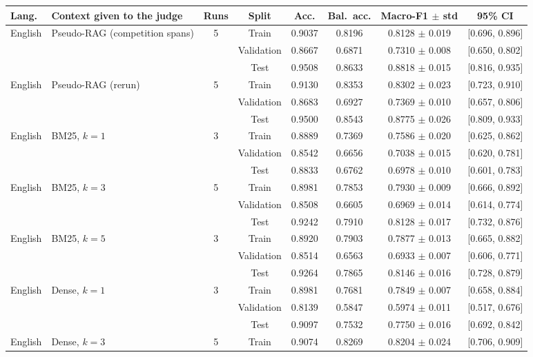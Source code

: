 \begin{tabular}{llcccccc}
\hline
\textbf{Lang.} & \textbf{Context given to the judge} & \textbf{Runs} & \textbf{Split} & \textbf{Acc.} & \textbf{Bal.\ acc.} & \textbf{Macro-F1 $\pm$ std} & \textbf{95\% CI} \\
\hline
English & Pseudo-RAG (competition spans) & 5 & Train & 0.9037 & 0.8196 & 0.8128 $\pm$ 0.019 & [0.696, 0.896] \\
 & &  & Validation & 0.8667 & 0.6871 & 0.7310 $\pm$ 0.008 & [0.650, 0.802] \\
 & &  & Test & 0.9508 & 0.8633 & 0.8818 $\pm$ 0.015 & [0.816, 0.935] \\
English & Pseudo-RAG (rerun) & 5 & Train & 0.9130 & 0.8353 & 0.8302 $\pm$ 0.023 & [0.723, 0.910] \\
 & &  & Validation & 0.8683 & 0.6927 & 0.7369 $\pm$ 0.010 & [0.657, 0.806] \\
 & &  & Test & 0.9500 & 0.8543 & 0.8775 $\pm$ 0.026 & [0.809, 0.933] \\
English & BM25, $k=1$ & 3 & Train & 0.8889 & 0.7369 & 0.7586 $\pm$ 0.020 & [0.625, 0.862] \\
 & &  & Validation & 0.8542 & 0.6656 & 0.7038 $\pm$ 0.015 & [0.620, 0.781] \\
 & &  & Test & 0.8833 & 0.6762 & 0.6978 $\pm$ 0.010 & [0.601, 0.783] \\
English & BM25, $k=3$ & 5 & Train & 0.8981 & 0.7853 & 0.7930 $\pm$ 0.009 & [0.666, 0.892] \\
 & &  & Validation & 0.8508 & 0.6605 & 0.6969 $\pm$ 0.014 & [0.614, 0.774] \\
 & &  & Test & 0.9242 & 0.7910 & 0.8128 $\pm$ 0.017 & [0.732, 0.876] \\
English & BM25, $k=5$ & 3 & Train & 0.8920 & 0.7903 & 0.7877 $\pm$ 0.013 & [0.665, 0.882] \\
 & &  & Validation & 0.8514 & 0.6563 & 0.6933 $\pm$ 0.007 & [0.606, 0.771] \\
 & &  & Test & 0.9264 & 0.7865 & 0.8146 $\pm$ 0.016 & [0.728, 0.879] \\
English & Dense, $k=1$ & 3 & Train & 0.8981 & 0.7681 & 0.7849 $\pm$ 0.007 & [0.658, 0.884] \\
 & &  & Validation & 0.8139 & 0.5847 & 0.5974 $\pm$ 0.011 & [0.517, 0.676] \\
 & &  & Test & 0.9097 & 0.7532 & 0.7750 $\pm$ 0.016 & [0.692, 0.842] \\
English & Dense, $k=3$ & 5 & Train & 0.9074 & 0.8269 & 0.8204 $\pm$ 0.024 & [0.706, 0.909] \\

\end{tabular}
